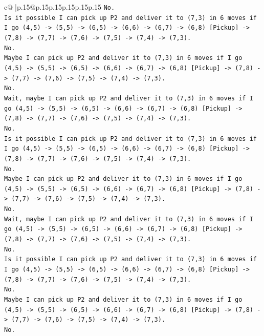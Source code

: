 \documentclass{article}
\begin{document}
{\begin{supertabular}{c@{$\;$}|p{.15\linewidth}@{}p{.15\linewidth}p{.15\linewidth}p{.15\linewidth}p{.15\linewidth}p{.15\linewidth}}
{{{\texttt{No.} \\
\texttt{Is it possible I can pick up P2 and deliver it to (7,3) in 6 moves if I go (4,5) {-}> (5,5) {-}> (6,5) {-}> (6,6) {-}> (6,7) {-}> (6,8) {[}Pickup{]} {-}> (7,8) {-}> (7,7) {-}> (7,6) {-}> (7,5) {-}> (7,4) {-}> (7,3).} \\
\texttt{No.} \\
\texttt{Maybe I can pick up P2 and deliver it to (7,3) in 6 moves if I go (4,5) {-}> (5,5) {-}> (6,5) {-}> (6,6) {-}> (6,7) {-}> (6,8) {[}Pickup{]} {-}> (7,8) {-}> (7,7) {-}> (7,6) {-}> (7,5) {-}> (7,4) {-}> (7,3).} \\
\texttt{No.} \\
\texttt{Wait, maybe I can pick up P2 and deliver it to (7,3) in 6 moves if I go (4,5) {-}> (5,5) {-}> (6,5) {-}> (6,6) {-}> (6,7) {-}> (6,8) {[}Pickup{]} {-}> (7,8) {-}> (7,7) {-}> (7,6) {-}> (7,5) {-}> (7,4) {-}> (7,3).} \\
\texttt{No.} \\
\texttt{Is it possible I can pick up P2 and deliver it to (7,3) in 6 moves if I go (4,5) {-}> (5,5) {-}> (6,5) {-}> (6,6) {-}> (6,7) {-}> (6,8) {[}Pickup{]} {-}> (7,8) {-}> (7,7) {-}> (7,6) {-}> (7,5) {-}> (7,4) {-}> (7,3).} \\
\texttt{No.} \\
\texttt{Maybe I can pick up P2 and deliver it to (7,3) in 6 moves if I go (4,5) {-}> (5,5) {-}> (6,5) {-}> (6,6) {-}> (6,7) {-}> (6,8) {[}Pickup{]} {-}> (7,8) {-}> (7,7) {-}> (7,6) {-}> (7,5) {-}> (7,4) {-}> (7,3).} \\
\texttt{No.} \\
\texttt{Wait, maybe I can pick up P2 and deliver it to (7,3) in 6 moves if I go (4,5) {-}> (5,5) {-}> (6,5) {-}> (6,6) {-}> (6,7) {-}> (6,8) {[}Pickup{]} {-}> (7,8) {-}> (7,7) {-}> (7,6) {-}> (7,5) {-}> (7,4) {-}> (7,3).} \\
\texttt{No.} \\
\texttt{Is it possible I can pick up P2 and deliver it to (7,3) in 6 moves if I go (4,5) {-}> (5,5) {-}> (6,5) {-}> (6,6) {-}> (6,7) {-}> (6,8) {[}Pickup{]} {-}> (7,8) {-}> (7,7) {-}> (7,6) {-}> (7,5) {-}> (7,4) {-}> (7,3).} \\
\texttt{No.} \\
\texttt{Maybe I can pick up P2 and deliver it to (7,3) in 6 moves if I go (4,5) {-}> (5,5) {-}> (6,5) {-}> (6,6) {-}> (6,7) {-}> (6,8) {[}Pickup{]} {-}> (7,8) {-}> (7,7) {-}> (7,6) {-}> (7,5) {-}> (7,4) {-}> (7,3).} \\
\texttt{No.} \\
}}}
\end{supertabular}}
\end{document}
